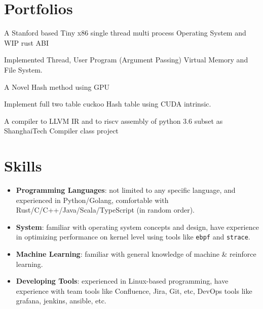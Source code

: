 \documentclass{resume}
\newcommand{\en}[1]{#1}
\newcommand{\zh}[1]{}
\begin{document}
\section{\en{Portfolios}\zh{团队项目}}
\en{A Stanford based Tiny x86 single thread multi process Operating System and WIP rust ABI}
\zh{一个玩具x86单核多线程操作系统，同时在写rust ABI层。}
\small{ \en{Implemented Thread, User Program (Argument Passing) Virtual Memory and File System.}\zh{实现了线程，Syscall和虚拟内存以及文件系统。}}

\en{A Novel Hash method using GPU}
\zh{一个在GPU上新颖的hash方法}
\small{ \en{Implement full two table cuckoo Hash table using CUDA intrinsic.}\zh{实现了双表杜鹃鸟表，这在数据降维等方面很有用处。}}

\en{A compiler to LLVM IR and to riscv assembly of python 3.6 subset as ShanghaiTech Compiler class project}
\zh{一个从 python3.6 子集编译至 LLVM IR 和 riscv 汇编的编译器，作为编译原理课的 project}

\section{\en{Skills}\zh{技能}}
\begin{itemize}[parsep=0.25ex]
      \item \en{\textbf{Programming Languages}:
                  not limited to any specific language,
                  and experienced in Python/Golang,
                  comfortable with Rust/C/C++/Java/Scala/TypeScript (in random order).}
            \zh{\textbf{编程语言}:
                  不局限于特定编程语言，且尤其熟悉 Python/Golang 等，
                  了解 Rust/C/C++/Java/Scala/TypeScript 等（不分先后）。}

      \item \en{\textbf{System}:
                  familiar with operating system concepts and design,
                  have experience in optimizing performance on kernel level using tools
                  like \texttt{ebpf} and \texttt{strace}.}
            \zh{\textbf{系统}:
                  熟悉各种操作系统内核的概念与设计，熟悉各种内核性能调优工具，例如 \texttt{ebpf} 和 \texttt{strace}。}

      \item \en{\textbf{Machine Learning}:
                  familiar with general knowledge of machine \& reinforce learning.}
            \zh{\textbf{机器学习}:
                  熟悉经典机器与强化学习算法。}

      \item \en{\textbf{Developing Tools}:
                  experienced in Linux-based programming,
                  have experience with team tools like Confluence, Jira, Git, etc, DevOps tools like grafana, jenkins, ansible, etc.}
            \zh{\textbf{开发工具}:
                  十分熟悉 Linux，有 Confluence、Jira、Git 等团队合作工具以及grafana、jenkins、ansible等集群自动化等工具的经验。}
\end{itemize}
\end{document}
